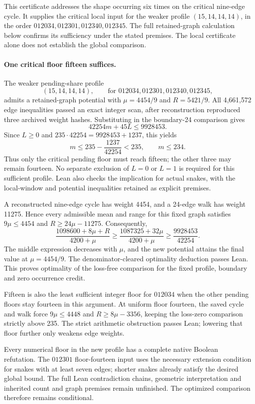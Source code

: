 \documentclass[11pt,a4paper]{article}
\theoremstyle{definition}
\theoremstyle{remark}
\begin{document}
This certificate addresses the shape occurring six times on the critical
nine-edge cycle. It supplies the critical local input for the weaker profile $(15,14,14,14)$,
in the order $012034,012301,012340,012345$. The full retained-graph calculation below confirms its sufficiency
under the stated premises. The local certificate alone does not
establish the global comparison.

\paragraph{One critical floor fifteen suffices.}
The weaker pending-share profile
\[
(15,14,14,14),\qquad\text{for }012034,012301,012340,012345,
\]
admits a retained-graph potential with $\mu=4454/9$ and $R=5421/9$.
All 4,661,572 edge inequalities passed an exact integer scan, after
reconstruction reproduced three archived weight hashes. Substituting
in the boundary-24 comparison gives
\[
\boxed{42254m+45L\le9928453.}
\]
Since $L\ge0$ and $235\cdot42254=9928453+1237$, this yields
\[
m\le235-\frac{1237}{42254}<235,\qquad m\le234.
\]
Thus only the critical pending floor must reach fifteen; the other three
may remain fourteen. No separate exclusion of $L=0$ or $L=1$ is required
for this sufficient profile. Lean also checks the implication for actual snakes, with the local-window
and potential inequalities retained as explicit premises.

A reconstructed nine-edge cycle has weight 4454, and a 24-edge walk has
weight 11275. Hence every admissible mean and range for this fixed graph
satisfies $9\mu\le4454$ and $R\ge24\mu-11275$. Consequently,
\[
\frac{1098600+8\mu+R}{4200+\mu}
\ge\frac{1087325+32\mu}{4200+\mu}
\ge\frac{9928453}{42254}.
\]
The middle expression decreases with $\mu$, and the new potential attains
the final value at $\mu=4454/9$. The denominator-cleared optimality
deduction passes Lean. This proves optimality of the loss-free comparison
for the fixed profile, boundary and zero occurrence credit.

Fifteen is also the least sufficient integer floor for $012034$ when the
other pending floors stay fourteen in this argument. At uniform floor
fourteen, the saved cycle and walk force $9\mu\le4448$ and
$R\ge8\mu-3356$, keeping the loss-zero comparison strictly above 235.
The strict arithmetic obstruction passes Lean; lowering that floor further
only weakens edge weights.

Every numerical floor in the new profile has a complete native Boolean
refutation. The $012301$ floor-fourteen input uses the necessary extension
condition for snakes with at least seven edges; shorter snakes already
satisfy the desired global bound. The full Lean contradiction chains,
geometric interpretation and inherited count and graph premises remain
unfinished. The optimized comparison therefore remains conditional.
\end{document}
